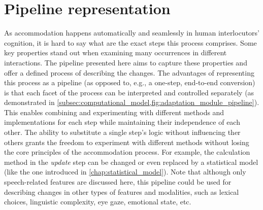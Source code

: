 \section{Pipeline representation}
\label{sec:pipeline_representation}

As accommodation happens automatically and seamlessly in human interlocutors' cognition, it is hard to say what are the exact steps this process comprises.
Some key properties stand out when examining many occurrences in different interactions.
The pipeline presented here aims to capture these properties and offer a defined process of describing the changes.
The advantages of representing this process as a pipeline (as opposed to, e.g., a one-step, end-to-end conversion) is that each facet of the process can be interpreted and controlled separately (as demonstrated in \cref{subsec:computational_model,fig:adaptation_module_pipeline}).
This enables combining and experimenting with different methods and implementations for each step while maintaining their independence of each other.
The ability to substitute a single step's logic without influencing ther others grants the freedom to experiment with different methods without losing the core principles of the accommodation process.
For example, the calculation method in the \textit{update} step can be changed or even replaced by a statistical model (like the one introduced in \cref{chap:statistical_model}).
Note that although only speech-related features are discussed here, this pipeline could be used for describing changes in other types of features and modalities, such as lexical choices, linguistic complexity, eye gaze, emotional state, etc.

